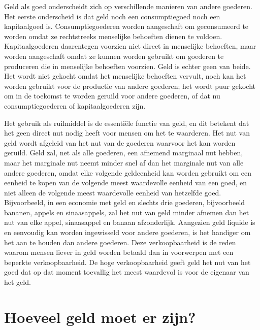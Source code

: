 \documentclass[
  a5paper,
  smalldemyvopaper,11pt,twoside,onecolumn,openright,extrafontsizes,
hidelinks]{memoir}
\begin{document}
Geld als goed onderscheidt zich op verschillende manieren van andere
goederen. Het eerste onderscheid is dat geld noch een consumptiegoed
noch een kapitaalgoed is. Consumptiegoederen worden aangeschaft om
geconsumeerd te worden omdat ze rechtstreeks menselijke behoeften dienen
te voldoen. Kapitaalgoederen daarentegen voorzien niet direct in
menselijke behoeften, maar worden aangeschaft omdat ze kunnen worden
gebruikt om goederen te produceren die in menselijke behoeften voorzien.
Geld is echter geen van beide. Het wordt niet gekocht omdat het
menselijke behoeften vervult, noch kan het worden gebruikt voor de
productie van andere goederen; het wordt puur gekocht om in de toekomst
te worden geruild voor andere goederen, of dat nu consumptiegoederen of
kapitaalgoederen zijn.

Het gebruik als ruilmiddel is de essentiële functie van geld, en dit
betekent dat het geen direct nut nodig heeft voor mensen om het te
waarderen. Het nut van geld wordt afgeleid van het nut van de goederen
waarvoor het kan worden geruild. Geld zal, net als alle goederen, een
afnemend marginaal nut hebben, maar het marginale nut neemt minder snel
af dan het marginale nut van alle andere goederen, omdat elke volgende
geldeenheid kan worden gebruikt om een eenheid te kopen van de volgende
meest waardevolle eenheid van een goed, en niet alleen de volgende meest
waardevolle eenheid van hetzelfde goed. Bijvoorbeeld, in een economie
met geld en slechts drie goederen, bijvoorbeeld bananen, appels en
sinaasappels, zal het nut van geld minder afnemen dan het nut van elke
appel, sinaasappel en banaan afzonderlijk. Aangezien geld liquide is en
eenvoudig kan worden ingewisseld voor andere goederen, is het handiger
om het aan te houden dan andere goederen. Deze verkoopbaarheid is de
reden waarom mensen liever in geld worden betaald dan in voorwerpen met
een beperkte verkoopbaarheid. De hoge verkoopbaarheid geeft geld het nut
van het goed dat op dat moment toevallig het meest waardevol is voor de
eigenaar van het geld.

\section{Hoeveel geld moet er zijn?}\label{hoeveel-geld-moet-er-zijn}
\end{document}
